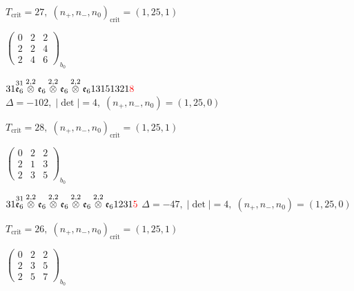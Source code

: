 \documentclass[10pt]{article}
\begin{document}
\hspace{1em}$T_{\text{crit}}=27,\; (n_+,n_-,n_0)_{\text{crit}}=(1,25,1)$

\hspace{2em}$\left(\begin{smallmatrix}0 & 2 & 2 \\ 2 & 2 & 4 \\ 2 & 4 & 6\end{smallmatrix}\right)_{\!b_0}$

$31\overset{31}{\mathfrak{e}_6}\overset{2,2}{\otimes}\mathfrak{e}_6\overset{2,2}{\otimes}\mathfrak{e}_6\overset{2,2}{\otimes}\mathfrak{e}_613151321\textcolor{red}{8}$ \quad $\Delta=-102,\; |\det|=4,\; (n_+,n_-,n_0)=(1,25,0)$

\hspace{1em}$T_{\text{crit}}=28,\; (n_+,n_-,n_0)_{\text{crit}}=(1,25,1)$

\hspace{2em}$\left(\begin{smallmatrix}0 & 2 & 2 \\ 2 & 1 & 3 \\ 2 & 3 & 5\end{smallmatrix}\right)_{\!b_0}$

\smallskip

$31\overset{31}{\mathfrak{e}_6}\overset{2,2}{\otimes}\mathfrak{e}_6\overset{2,2}{\otimes}\mathfrak{e}_6\overset{2,2}{\otimes}\mathfrak{e}_6\overset{2,2}{\otimes}\mathfrak{e}_61231\textcolor{red}{5}$ \quad $\Delta=-47,\; |\det|=4,\; (n_+,n_-,n_0)=(1,25,0)$

\hspace{1em}$T_{\text{crit}}=26,\; (n_+,n_-,n_0)_{\text{crit}}=(1,25,1)$

\hspace{2em}$\left(\begin{smallmatrix}0 & 2 & 2 \\ 2 & 3 & 5 \\ 2 & 5 & 7\end{smallmatrix}\right)_{\!b_0}$

\smallskip
\end{document}
